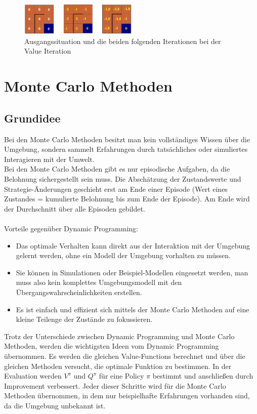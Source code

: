 \documentclass[10pt]{scrartcl}
\begin{document}
\begin{figure}[htbp]
	\centering	\includegraphics[width=0.5\textwidth]{Bilder/ValueIterationAufgabe}
	\caption{Ausgangssituation und die beiden folgenden Iterationen bei der Value Iteration}
	\label{fig:value_aufgabe}
\end{figure}


\section{Monte Carlo Methoden}
\subsection{Grundidee}
Bei den Monte Carlo Methoden besitzt man kein vollständiges Wissen über die Umgebung, sondern sammelt Erfahrungen durch tatsächliches oder simuliertes Interagieren mit der Umwelt.\\
Bei den Monte Carlo Methoden gibt es nur episodische Aufgaben, da die Belohnung sichergestellt sein muss. Die Abschätzung der Zustandswerte und Strategie-Änderungen geschieht erst am Ende einer Episode (Wert eines Zustandes = kumulierte Belohnung bis zum Ende der Episode). Am Ende wird der Durchschnitt über alle Episoden gebildet.\\
\\
Vorteile gegenüber Dynamic Programming:
\begin{itemize}
\item{Das optimale Verhalten kann direkt aus der Interaktion mit der Umgebung gelernt werden, ohne ein Modell der Umgebung vorhalten zu müssen.}
\item{Sie können in Simulationen oder Beispiel-Modellen eingesetzt werden, man muss also kein komplettes Umgebungsmodell mit den Übergangswahrscheinlichkeiten erstellen.}
\item{Es ist einfach und effizient sich mittels der Monte Carlo Methoden auf eine kleine Teilenge der Zustände zu fokussieren.}
\end{itemize}

Trotz der Unterschiede zwischen Dynamic Programming und Monte Carlo Methoden, werden die wichtigsten Ideen vom Dynamic Programming übernommen. Es werden die gleichen Value-Functions berechnet und über die gleichen Methoden versucht, die optimale Funktion zu bestimmen. In der Evaluation werden $V^{\pi}$ und $Q^{\pi}$ für eine Policy $\pi$ bestimmt und anschließen durch Improvement verbessert. Jeder dieser Schritte wird für die Monte Carlo Methoden übernommen, in dem nur beispielhafte Erfahrungen vorhanden sind, da die Umgebung unbekannt ist.
\end{document}

